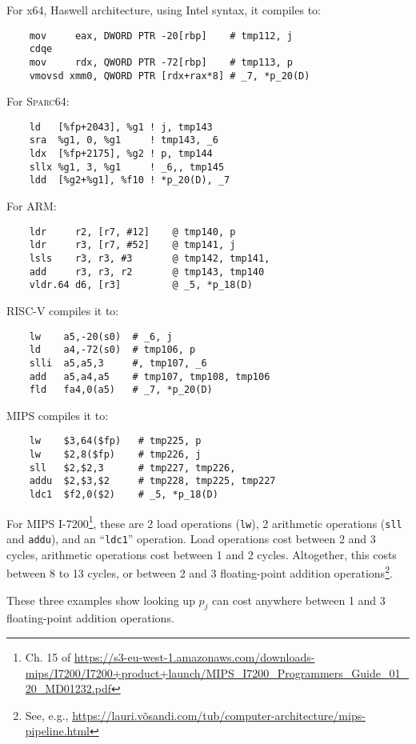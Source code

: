 \begin{rmk}
For x64, Haswell architecture, using Intel syntax, it compiles to:
\begin{Verbatim}
    mov     eax, DWORD PTR -20[rbp]    # tmp112, j
    cdqe
    mov     rdx, QWORD PTR -72[rbp]    # tmp113, p
    vmovsd xmm0, QWORD PTR [rdx+rax*8] # _7, *p_20(D)
\end{Verbatim}
For \textsc{Sparc64}:
\begin{Verbatim}
    ld   [%fp+2043], %g1 ! j, tmp143
    sra  %g1, 0, %g1     ! tmp143, _6
    ldx  [%fp+2175], %g2 ! p, tmp144
    sllx %g1, 3, %g1     ! _6,, tmp145
    ldd  [%g2+%g1], %f10 ! *p_20(D), _7
\end{Verbatim}
For ARM:
\begin{Verbatim}
    ldr     r2, [r7, #12]    @ tmp140, p
    ldr     r3, [r7, #52]    @ tmp141, j
    lsls    r3, r3, #3       @ tmp142, tmp141,
    add     r3, r3, r2       @ tmp143, tmp140
    vldr.64 d6, [r3]         @ _5, *p_18(D)
\end{Verbatim}
RISC-V compiles it to:
\begin{Verbatim}
    lw    a5,-20(s0)  # _6, j
    ld    a4,-72(s0)  # tmp106, p
    slli  a5,a5,3     #, tmp107, _6
    add   a5,a4,a5    # tmp107, tmp108, tmp106
    fld   fa4,0(a5)   # _7, *p_20(D)
\end{Verbatim}
MIPS compiles it to:
\begin{Verbatim}
    lw    $3,64($fp)   # tmp225, p
    lw    $2,8($fp)    # tmp226, j
    sll   $2,$2,3      # tmp227, tmp226,
    addu  $2,$3,$2     # tmp228, tmp225, tmp227
    ldc1  $f2,0($2)    # _5, *p_18(D)
\end{Verbatim}
For MIPS I-7200\footnote{Ch. 15 of \url{https://s3-eu-west-1.amazonaws.com/downloads-mips/I7200/I7200+product+launch/MIPS_I7200_Programmers_Guide_01_20_MD01232.pdf}},
these are 2 load operations (\texttt{lw}), 2 arithmetic operations
(\texttt{sll} and \texttt{addu}), and an ``\verb#ldc1#'' operation. Load
operations cost between 2 and 3 cycles, arithmetic operations cost
between 1 and 2 cycles. Altogether, this costs between 8 to 13 cycles,
or between 2 and 3 floating-point addition operations\footnote{See,
e.g., \url{https://lauri.võsandi.com/tub/computer-architecture/mips-pipeline.html}}.

These three examples show looking up $p_{j}$ can cost anywhere between 1
and 3 floating-point addition operations.
\end{rmk}